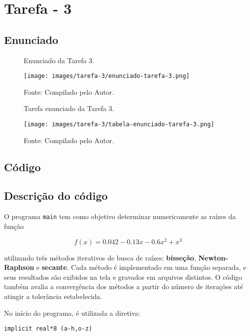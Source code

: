\chapter*{Tarefa - 3}

\section*{Enunciado}

\begin{figure}[h!]
\centering
\caption{Enunciado da Tarefa 3.}
\centering
\texttt{[image: images/tarefa-3/enunciado-tarefa-3.png]}
\caption*{Fonte: Compilado pelo Autor.}
\label{fig:tarefa 3 - Enunciado}
\end{figure}

\begin{figure}[h!]
\centering
\caption{Tarefa enunciado da Tarefa 3.}
\centering
\texttt{[image: images/tarefa-3/tabela-enunciado-tarefa-3.png]}
\caption*{Fonte: Compilado pelo Autor.}
\label{fig:tarefa 3 - Tabela Enunciado}
\end{figure}

\section*{Código}

\section*{Descrição do código}

O programa \texttt{main} tem como objetivo determinar numericamente as raízes da função

\begin{equation}
	f(x) = 0.042 - 0.13x - 0.6x^2 + x^3
\end{equation}

\noindent
utilizando três métodos iterativos de busca de raízes: 
\textbf{bisseção}, \textbf{Newton-Raphson} e \textbf{secante}.  
Cada método é implementado em uma função separada, e seus resultados são exibidos na tela e gravados em arquivos distintos.  
O código também avalia a convergência dos métodos a partir do número de iterações até atingir a tolerância estabelecida.

\bigskip
No início do programa, é utilizada a diretiva:

\vspace*{1\baselineskip}
\begin{lstlisting}
implicit real*8 (a-h,o-z)
\end{lstlisting}

